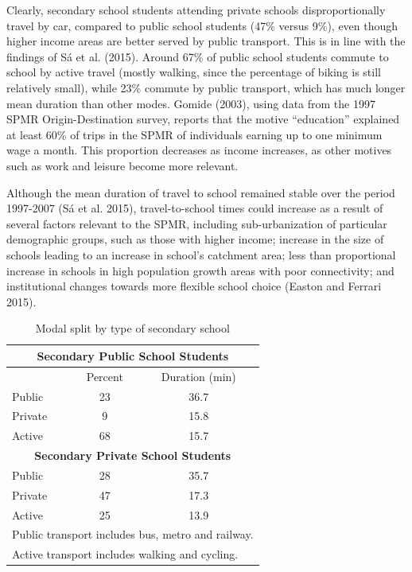 \documentclass[3p,authoryear,preprint,review,12pt]{elsarticle}
\begin{document}
Clearly, secondary school students attending private schools disproportionally travel by car, compared to public school students (47\% versus 9\%), even though higher income areas are better served by public transport. This is in line with the findings of
S{á} et al. (2015). Around 67\% of public school students commute to
school by active travel (mostly walking, since the percentage of biking is still relatively small), while 23\% commute by public transport, which has much longer mean duration than other modes. Gomide (2003), using data from the 1997 SPMR Origin-Destination survey, reports that the motive ``education'' explained at least 60\% of trips in the SPMR of individuals earning up to one minimum wage a month. This proportion decreases as income increases, as other motives such as work and leisure become more relevant.

Although the mean duration of travel to school remained stable over the period 1997-2007 (S{á} et al. 2015), travel-to-school times could increase as a result of several factors relevant to the SPMR, including sub-urbanization of particular demographic groups, such as those with higher income; increase in the size of schools leading to an increase in school's catchment area; less than proportional increase in schools in high population growth areas with poor connectivity; and institutional changes towards more flexible school choice (Easton and Ferrari 2015).

\begin{table}[H]\centering \caption{Modal split by type of secondary school}
\begin{tabular}{lcc} \hline
\multicolumn{3}{c}{\textbf{Secondary Public School Students}}  \\  \hline
 & Percent & Duration (min)  \\ \hline
Public & 23 & 36.7 \\
Private & 9 & 15.8 \\
Active & 68 & 15.7 \\ \hline
\multicolumn{3}{c}{\textbf{Secondary Private School Students}}  \\  \hline
Public & 28 & 35.7 \\ 
Private & 47 & 17.3 \\
Active & 25 & 13.9 \\\hline
\multicolumn{3}{l}{\small Public transport includes bus, metro and railway.} \\
\multicolumn{3}{l}{\small Active transport includes walking and cycling.}  
\end{tabular}
\end{table} \label{split}
\end{document}
